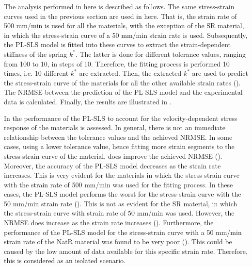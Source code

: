 The analysis performed in here is described as follows. The same stress-strain curves used in the previous section are used in here. That is, the strain rate of 500 mm/min is used for all the materials, with the exception of the SR material, in which the stress-strain curve of a 50 mm/min strain rate is used. Subsequently, the PL-SLS model is fitted into these curves to extract the strain-dependent stiffness of the spring $k^*$. The latter is done for different tolerance values, ranging from 100 to 10, in steps of 10. Therefore, the fitting process is performed 10 times, i.e. 10 different $k^*$ are extracted. Then, the extracted $k^*$ are used to predict the stress-strain curve of the materials for all the other available strain rates (). The NRMSE between the prediction of the PL-SLS model and the experimental data is calculated. Finally, the results are illustrated in .

In  the performance of the PL-SLS to account for the velocity-dependent stress response of the materials is assessed. In general, there is not an immediate relationship between the tolerance values and the achieved NRMSE. In some cases, using a lower tolerance value, hence fitting more strain segments to the stress-strain curve of the material, does improve the achieved NRMSE (). Moreover, the accuracy of the PL-SLS model decreases as the strain rate increases. This is very evident for the materials in which the stress-strain curve with the strain rate of 500 mm/min was used for the fitting process. In these cases, the PL-SLS model performs the worst for the stress-strain curve with the 50 mm/min strain rate (). This is not as evident for the SR material, in which the stress-strain curve with strain rate of 50 mm/min was used. However, the NRMSE does increase as the strain rate increases (). Furthermore, the performance of the PL-SLS model for the stress-strain curve with a 50 mm/min strain rate of the NatR material was found to be very poor (). This could be caused by the low amount of data available for this specific strain rate. Therefore, this is considered as an isolated scenario.

